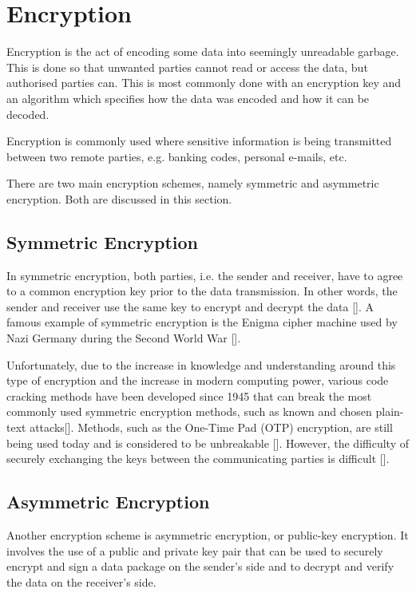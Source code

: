 \section{Encryption}

Encryption is the act of encoding some data into seemingly unreadable garbage. This is done so
that unwanted parties cannot read or access the data, but authorised parties can. This
is most commonly done with an encryption key and an algorithm which specifies how the data
was encoded and how it can be decoded.

Encryption is commonly used where sensitive information is being transmitted between
two remote parties, e.g. banking codes, personal e-mails, etc.

There are two main encryption schemes, namely symmetric and asymmetric encryption. Both
are discussed in this section.

\subsection{Symmetric Encryption}

In symmetric encryption, both parties, i.e. the sender and receiver, have to agree to a common
encryption key prior to the data transmission. In other words, the sender and receiver use the
same key to encrypt and decrypt the data [\cite{article:symm-encryption}]. A famous example
of symmetric encryption is the Enigma cipher machine used by Nazi Germany
during the Second World War [\cite{article:enigma}].

Unfortunately, due to the increase in knowledge and understanding around this type of
encryption and the increase in modern computing power, various code cracking methods have been
developed since 1945 that can break the most commonly used symmetric encryption
methods, such as known and chosen plain-text attacks[\cite{journal:cypher-attacks}].
Methods, such as the One-Time Pad (OTP) encryption, are still being
used today and is considered to be unbreakable [\cite{article:otp}]. However,
the difficulty of securely exchanging the keys between the communicating parties
is difficult [\cite{article:otp}]. 

\subsection{Asymmetric Encryption}
\label{sec:assymetric-encryption}

Another encryption scheme is asymmetric encryption, or public-key
encryption. It involves the use of a public and private key pair that can be
used to securely encrypt and sign a data package on the sender's side and to
decrypt and verify the data on the receiver's side.

